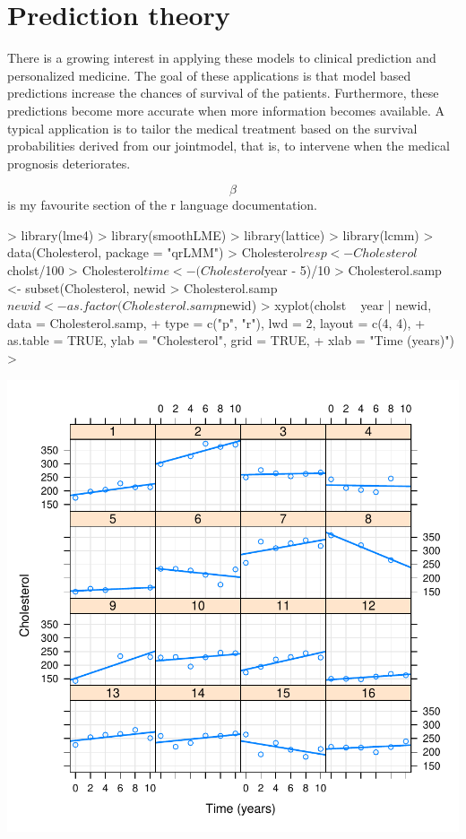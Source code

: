 \documentclass{article}
\begin{document}


\section{Prediction theory}
There is a growing interest in applying these models to clinical prediction and personalized medicine. The goal of these applications is that model based  predictions increase the chances of survival of the patients. Furthermore, these predictions become more accurate when more information becomes available. A typical application is to tailor the medical treatment based on the survival probabilities derived from our jointmodel, that is, to intervene when the medical prognosis deteriorates.

$$\beta$$ is my favourite section of the r language documentation.
\begin{Schunk}
\begin{Sinput}
> library(lme4)
> library(smoothLME)
> library(lattice)
> library(lcmm)
> data(Cholesterol, package = "qrLMM")
> Cholesterol$resp <- Cholesterol$cholst/100
> Cholesterol$time <- (Cholesterol$year - 5)/10
> Cholesterol.samp <- subset(Cholesterol, newid %
> Cholesterol.samp$newid <- as.factor(Cholesterol.samp$newid)
> xyplot(cholst ~ year | newid, data = Cholesterol.samp,
+        type = c("p", "r"), lwd = 2, layout = c(4, 4),
+        as.table = TRUE, ylab = "Cholesterol", grid = TRUE,
+        xlab = "Time (years)")
> 
\end{Sinput}
\end{Schunk}
\includegraphics{tobdel2-001}
\end{document}
